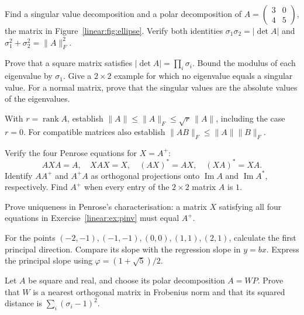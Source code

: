 \begin{exercise}[$\star$]\label{linear:ex:svd2}
Find a singular value decomposition and a polar decomposition of $A=\begin{pmatrix}3&0\\4&5\end{pmatrix}$, the matrix in Figure~\ref{linear:fig:ellipse}. Verify both identities $\sigma_1\sigma_2=|\det A|$ and $\sigma_1^2+\sigma_2^2=\|A\|_F^2$.
\end{exercise}
\begin{exercise}[$\star$]\label{linear:ex:normsvd}
Prove that a square matrix satisfies $|\det A|=\prod_i\sigma_i$. Bound the modulus of each eigenvalue by $\sigma_1$. Give a $2\times2$ example for which no eigenvalue equals a singular value. For a normal matrix, prove that the singular values are the absolute values of the eigenvalues.
\end{exercise}
\begin{exercise}[$\star$]\label{linear:ex:normineq}
With $r=\operatorname{rank}A$, establish $\|A\|\le\|A\|_F\le\sqrt r\,\|A\|$, including the case $r=0$. For compatible matrices also establish $\|AB\|_F\le\|A\|\|B\|_F$.
\end{exercise}
\begin{exercise}[$\star$]\label{linear:ex:pinv}
Verify the four Penrose equations for $X=A^+$:
\[
AXA=A,\quad XAX=X,\quad (AX)^*=AX,\quad (XA)^*=XA.
\]
Identify $AA^+$ and $A^+A$ as orthogonal projections onto $\operatorname{Im}A$ and $\operatorname{Im}A^*$, respectively. Find $A^+$ when every entry of the $2\times2$ matrix $A$ is $1$.
\end{exercise}
\begin{exercise}[$\star\star$]\label{linear:ex:penroseunique}
Prove uniqueness in Penrose's characterisation: a matrix $X$ satisfying all four equations in Exercise~\ref{linear:ex:pinv} must equal $A^+$.
\end{exercise}
\begin{exercise}[$\star\star$]\label{linear:ex:pcatoy}
For the points $(-2,-1),(-1,-1),(0,0),(1,1),(2,1)$, calculate the first principal direction. Compare its slope with the regression slope in $y=bx$. Express the principal slope using $\varphi=(1+\sqrt5)/2$.
\end{exercise}
\begin{exercise}[$\star\star$]\label{linear:ex:nearestorth}
Let $A$ be square and real, and choose its polar decomposition $A=WP$. Prove that $W$ is a nearest orthogonal matrix in Frobenius norm and that its squared distance is $\sum_i(\sigma_i-1)^2$.
\end{exercise}
